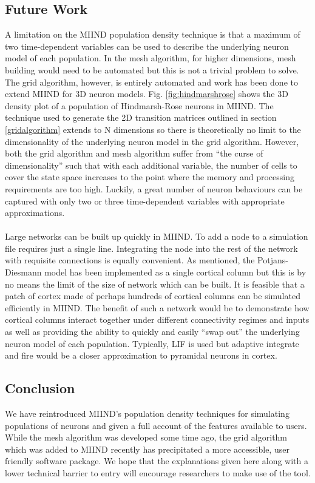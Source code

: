 \documentclass[utf8]{frontiersSCNS} %
\begin{document}
\subsection*{Future Work}
A limitation on the MIIND population density technique is that a maximum of two time-dependent variables can be used to describe the underlying neuron model of each population. In the mesh algorithm, for higher dimensions, mesh building would need to be automated but this is not a trivial problem to solve. The grid algorithm, however, is entirely automated and work has been done to extend MIIND for 3D neuron models. Fig. \ref{fig:hindmarshrose} shows the 3D density plot of a population of Hindmarsh-Rose neurons in MIIND. The technique used to generate the 2D transition matrices outlined in section \ref{gridalgorithm} extends to N dimensions so there is theoretically no limit to the dimensionality of the underlying neuron model in the grid algorithm. However, both the grid algorithm and mesh algorithm suffer from ``the curse of dimensionality'' such that with each additional variable, the number of cells to cover the state space increases to the point where the memory and processing requirements are too high. Luckily, a great number of neuron behaviours can be captured with only two or three time-dependent variables with appropriate approximations.\\
\\
 Large networks can be built up quickly in MIIND. To add a node to a simulation file requires just a single line. Integrating the node into the rest of the network with requisite connections is equally convenient. As mentioned, the Potjans-Diesmann model has been implemented as a single cortical column but this is by no means the limit of the size of network which can be built. It is feasible that a patch of cortex made of perhaps hundreds of cortical columns can be simulated efficiently in MIIND. The benefit of such a network would be to demonstrate how cortical columns interact together under different connectivity regimes and inputs as well as providing the ability to quickly and easily ``swap out'' the underlying neuron model of each population. Typically, LIF is used but adaptive integrate and fire would be a closer approximation to pyramidal neurons in cortex.\\
 
 \subsection*{Conclusion}
 We have reintroduced MIIND's population density techniques for simulating populations of neurons and given a full account of the features available to users. While the mesh algorithm was developed some time ago, the grid algorithm which was added to MIIND recently has precipitated a more accessible, user friendly software package. We hope that the explanations given here along with a lower technical barrier to entry will encourage researchers to make use of the tool. 
\end{document}
